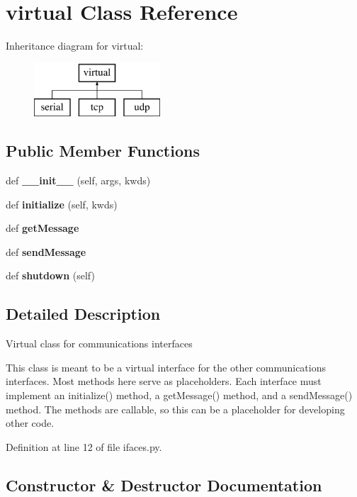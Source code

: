 \section{virtual Class Reference}
\label{classprotolibs_1_1ifaces_1_1virtual}
Inheritance diagram for virtual\+:\begin{figure}[H]
\begin{center}
\leavevmode
\includegraphics[height=2.000000cm]{classprotolibs_1_1ifaces_1_1virtual}
\end{center}
\end{figure}
\subsection*{Public Member Functions}
\begin{DoxyCompactItemize}
\item 
def {\bf \+\_\+\+\_\+init\+\_\+\+\_\+} (self, args, kwds)
\item 
def {\bf initialize} (self, kwds)
\item 
def {\bf get\+Message}
\item 
def {\bf send\+Message}
\item 
def {\bf shutdown} (self)
\end{DoxyCompactItemize}


\subsection{Detailed Description}
\begin{DoxyVerb}Virtual class for communications interfaces

This class is meant to be a virtual interface for the other communications 
interfaces. Most methods here serve as placeholders. Each interface must
implement an initialize() method, a getMessage() method, and a sendMessage()
method. The methods are callable, so this can be a placeholder for
developing other code.
\end{DoxyVerb}
 

Definition at line 12 of file ifaces.\+py.



\subsection{Constructor \& Destructor Documentation}
